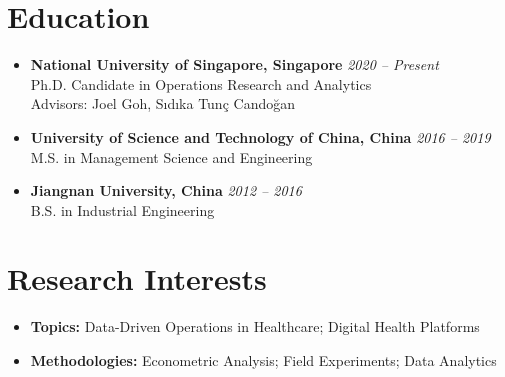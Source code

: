 \documentclass[12pt, a4paper]{article}
\begin{document}
{\small

\section*{Education}

\begin{itemize}

	\item[]
	\textbf{National University of Singapore, Singapore} \hfill \textit{2020 -- Present} \\
	Ph.D. Candidate in Operations Research and Analytics \\
	Advisors: Joel Goh, S\i{}d\i{}ka Tun\c{c} Cando\u{g}an

	\item[]
	\textbf{University of Science and Technology of China, China} \hfill \textit{2016 -- 2019} \\
	M.S. in Management Science and Engineering

	\item[]
	\textbf{Jiangnan University, China} \hfill \textit{2012 -- 2016} \\
	B.S. in Industrial Engineering

\end{itemize}




\section*{Research Interests}

\begin{itemize}
    \item[] \textbf{Topics:} Data-Driven Operations in Healthcare; Digital Health Platforms
    \item[] \textbf{Methodologies:} Econometric Analysis; Field Experiments; Data Analytics
\end{itemize}




}
\end{document}
